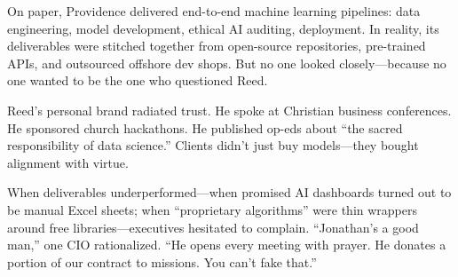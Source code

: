 On paper, Providence delivered end-to-end machine learning pipelines: data engineering, model development, ethical AI auditing, deployment. In reality, its deliverables were stitched together from open-source repositories, pre-trained APIs, and outsourced offshore dev shops. But no one looked closely—because no one wanted to be the one who questioned Reed.

Reed’s personal brand radiated trust. He spoke at Christian business conferences. He sponsored church hackathons. He published op-eds about “the sacred responsibility of data science.” Clients didn’t just buy models—they bought alignment with virtue.

When deliverables underperformed—when promised AI dashboards turned out to be manual Excel sheets; when “proprietary algorithms” were thin wrappers around free libraries—executives hesitated to complain. “Jonathan’s a good man,” one CIO rationalized. “He opens every meeting with prayer. He donates a portion of our contract to missions. You can’t fake that.”




